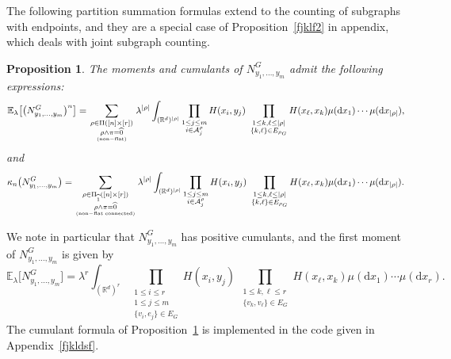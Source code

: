\documentclass[12pt]{article}
\newcommand{\R}{\mathbb{R}}
\newcommand{\E}{\mathbb{E}}
\newtheorem{prop}{Proposition}[section]
\numberwithin{equation}{section}
\begin{document}
\medskip 

 The following partition summation formulas 
 extend \cite[Proposition~5.1]{LiuPrivault}
 to the counting of subgraphs with endpoints,
 and they are a special case of 
 Proposition~\ref{fjklf2} in appendix,
 which deals with joint subgraph counting. 
\begin{prop}
\label{mom-cumfor}
 The moments and cumulants of $N_{y_1,\ldots , y_m}^G$ admit
 the following expressions: 
$$
  \E_\lambda \big[\big(N_{y_1,\ldots , y_m}^G\big)^n\big]=
  \sum_{\substack{\rho\in\Pi ([n]\times[r])
      \\\rho\wedge\pi=\widehat{0}} \atop {\rm (non-flat)}}
  \lambda^{|\rho |}
  \int_{(\R^d)^{|\rho|}}\prod_{\substack{ %
      1 \leq j \leq m
      \\ i\in {\cal A}^\rho_j}}
    H(x_i,y_j)
    \ \prod_{
      \substack{1 \leq k , \ell \le|\rho|
        \\
        \{ k , \ell \}\in E_{\rho_G} 
    }}H(x_\ell,x_k)\mu ( \mathrm{d}x_1 ) \cdots \mu ( \mathrm{d}x_{|\rho|}),
    $$
    and
    \begin{equation}
      \label{cumulant-diagram1}
    \kappa_n\big(N_{y_1,\ldots , y_m}^G\big)=
    \sum_{\substack{\rho\in\Pi_{\widehat{1}} ([n]\times[r])
        \\\rho\wedge\pi=\widehat{0}} \atop {\rm (non-flat \ \! connected)}}
  \lambda^{|\rho |}
  \int_{(\R^d)^{|\rho|}}\prod_{
    \substack{%
    1 \leq j \leq m
      \\
    i\in {\cal A}^\rho_j}}  H(x_i,y_j)
  \ \prod_{\substack{
      1\leq k , \ell \le|\rho|
      \\
      \{ k , \ell \}\in E_{\rho_G} }}H(x_\ell,x_k)\mu ( \mathrm{d}x_1)
  \cdots \mu ( \mathrm{d}x_{|\rho|} ).
\end{equation} 
\end{prop}
We note in particular that $N_{y_1,\ldots , y_m}^G$ has positive cumulants, and
the first moment of $N_{y_1,\ldots , y_m}^G$ is given by 
$$
 \E_\lambda \big[ N_{y_1,\ldots , y_m}^G \big]
 =  \lambda^r 
     \int_{(\R^d)^r}
     \prod_{
       \substack{
         1 \leq i \leq r \\
       1 \leq j \leq m
      \\
      \{v_i,e_j\} \in E_G
     }}  H(x_i,y_j)
  \ \prod_{\substack{
      1\leq k , \ell \leq r 
      \\
      \{ v_k , v_\ell \}\in E_G}}H(x_\ell,x_k)
  \mu ( \mathrm{d}x_1)
  \cdots
  \mu ( \mathrm{d}x_r).
$$ 
\noindent
The cumulant formula of Proposition~\ref{mom-cumfor}
is implemented in the code given in Appendix~\ref{fjkldsf}. 
\end{document}

